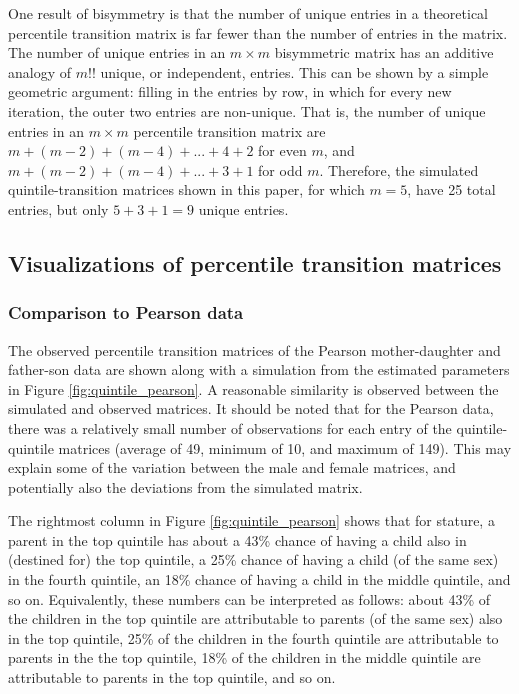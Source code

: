 \documentclass[a4paper,11pt]{article} %
\begin{document}
One result of bisymmetry is that the number of unique entries in a theoretical percentile transition matrix is far fewer than the number of entries in the matrix. The number of unique entries in an $m \times m$ bisymmetric matrix has an additive analogy of $m!!$ unique, or independent, entries. This can be shown by a simple geometric argument: filling in the entries by row, in which for every new iteration, the outer two entries are non-unique. That is, the number of unique entries in an $m \times m$ percentile transition matrix are $m + (m-2) + (m-4) + ... + 4 + 2$ for even $m$, and $m + (m-2) + (m-4) + ... + 3 + 1$ for odd $m$. Therefore, the simulated quintile-transition matrices shown in this paper, for which $m = 5$, have 25 total entries, but only $5+3+1 = 9$ unique entries.



\subsection{Visualizations of percentile transition matrices}

\subsubsection*{Comparison to Pearson data}

The observed percentile transition matrices of the Pearson mother-daughter and father-son data are shown along with a simulation from the estimated parameters in Figure \ref{fig:quintile_pearson}. A reasonable similarity is observed between the simulated and observed matrices. It should be noted that for the Pearson data, there was a relatively small number of observations for each entry of the quintile-quintile matrices (average of 49, minimum of 10, and maximum of 149). This may explain some of the variation between the male and female matrices, and potentially also the deviations from the simulated matrix. 

The rightmost column in Figure \ref{fig:quintile_pearson} shows that for stature, a parent in the top quintile has about a 43\% chance of having a child also in (destined for) the top quintile, a 25\% chance of having a child (of the same sex) in the fourth quintile, an 18\% chance of having a child in the middle quintile, and so on. Equivalently, these numbers can be interpreted as follows: about 43\% of the children in the top quintile are attributable to parents (of the same sex) also in the top quintile, 25\% of the children in the fourth quintile are attributable to parents in the the top quintile, 18\% of the children in the middle quintile are attributable to parents in the top quintile, and so on. 
\end{document}
